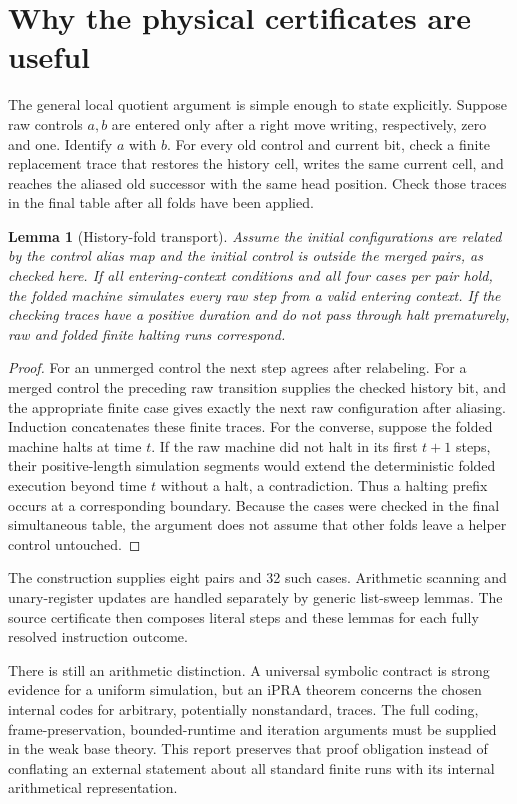 \documentclass[11pt]{article}
\newtheorem{lemma}[theorem]{Lemma}
\begin{document}


\section{Why the physical certificates are useful}

The general local quotient argument is simple enough to state explicitly.
Suppose raw controls $a,b$ are entered only after a right move writing,
respectively, zero and one. Identify $a$ with $b$. For every old control
and current bit, check a finite replacement trace that restores the
history cell, writes the same current cell, and reaches the aliased old
successor with the same head position. Check those traces in the final
table after all folds have been applied.

\begin{lemma}[History-fold transport]
Assume the initial configurations are related by the control alias map
and the initial control is outside the merged pairs, as checked here.
If all entering-context conditions and all four cases per pair hold, the
folded machine simulates every raw step from a valid entering context.
If the checking traces have a positive duration and do not pass through
halt prematurely, raw and folded finite halting runs correspond.
\end{lemma}
\begin{proof}
For an unmerged control the next step agrees after relabeling. For a
merged control the preceding raw transition supplies the checked history
bit, and the appropriate finite case gives exactly the next raw
configuration after aliasing. Induction concatenates these finite traces.
For the converse, suppose the folded machine halts at time $t$. If the
raw machine did not halt in its first $t+1$ steps, their positive-length
simulation segments would extend the deterministic folded execution
beyond time $t$ without a halt, a contradiction. Thus a halting prefix
occurs at a corresponding boundary. Because the cases were
checked in the final simultaneous table, the argument does not assume
that other folds leave a helper control untouched.
\end{proof}

The construction supplies eight pairs and 32 such cases. Arithmetic
scanning and unary-register updates are handled separately by generic
list-sweep lemmas. The source certificate then composes literal steps and
these lemmas for each fully resolved instruction outcome.

There is still an arithmetic distinction. A universal symbolic contract
is strong evidence for a uniform simulation, but an iPRA theorem concerns
the chosen internal codes for arbitrary, potentially nonstandard, traces.
The full coding, frame-preservation, bounded-runtime and iteration
arguments must be supplied in the weak base theory. This report preserves
that proof obligation instead of conflating an external statement about
all standard finite runs with its internal arithmetical representation.
\end{document}
